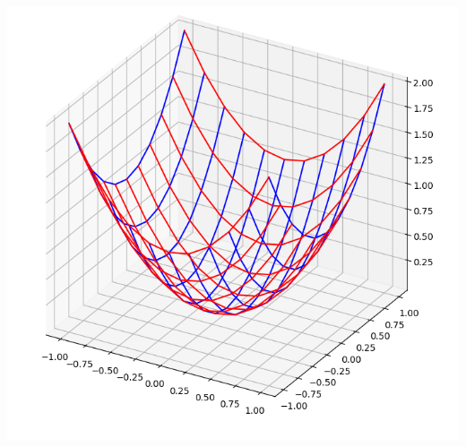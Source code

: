 \documentclass[11pt,class=report,crop=false]{standalone}
\begin{document}
\begin{activite}[Surfaces]
\begin{enumerate}
\begin{enumerate}
\begin{center}
	  	\includegraphics[scale=\myscale,scale=0.2]{ecran-surface-9}
	  \end{center}
	\end{enumerate}
\end{enumerate}



\end{activite}




\end{document}
